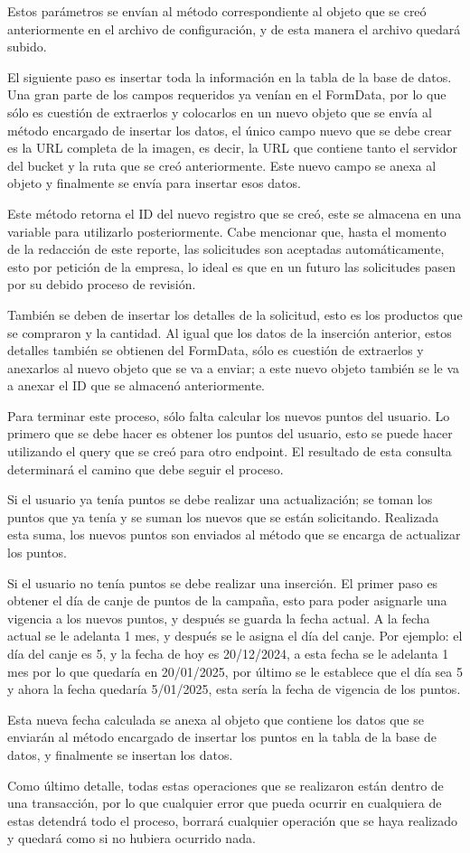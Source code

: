 Estos parámetros se envían al método correspondiente al objeto que se creó anteriormente en el archivo de configuración, y de esta manera el archivo quedará subido.

El siguiente paso es insertar toda la información en la tabla de la base de datos. Una gran parte de los campos requeridos ya venían en el FormData, por lo que sólo es cuestión de extraerlos y colocarlos en un nuevo objeto que se envía al método encargado de insertar los datos, el único campo nuevo que se debe crear es la URL completa de la imagen, es decir, la URL que contiene tanto el servidor del bucket y la ruta que se creó anteriormente. Este nuevo campo se anexa al objeto y finalmente se envía para insertar esos datos.

Este método retorna el ID del nuevo registro que se creó, este se almacena en una variable para utilizarlo posteriormente. Cabe mencionar que, hasta el momento de la redacción de este reporte, las solicitudes son aceptadas automáticamente, esto por petición de la empresa, lo ideal es que en un futuro las solicitudes pasen por su debido proceso de revisión.

También se deben de insertar los detalles de la solicitud, esto es los productos que se compraron y la cantidad. Al igual que los datos de la inserción anterior, estos detalles también se obtienen del FormData, sólo es cuestión de extraerlos y anexarlos al nuevo objeto que se va a enviar; a este nuevo objeto también se le va a anexar el ID que se almacenó anteriormente.

Para terminar este proceso, sólo falta calcular los nuevos puntos del usuario. Lo primero que se debe hacer es obtener los puntos del usuario, esto se puede hacer utilizando el query que se creó para otro endpoint. El resultado de esta consulta determinará el camino que debe seguir el proceso.

Si el usuario ya tenía puntos se debe realizar una actualización; se toman los puntos que ya tenía y se suman los nuevos que se están solicitando. Realizada esta suma, los nuevos puntos son enviados al método que se encarga de actualizar los puntos.

Si el usuario no tenía puntos se debe realizar una inserción. El primer paso es obtener el día de canje de puntos de la campaña, esto para poder asignarle una vigencia a los nuevos puntos, y después se guarda la fecha actual. A la fecha actual se le adelanta 1 mes, y después se le asigna el día del canje. Por ejemplo: el día del canje es 5, y la fecha de hoy es 20/12/2024, a esta fecha se le adelanta 1 mes por lo que quedaría en 20/01/2025, por último se le establece que el día sea 5 y ahora la fecha quedaría 5/01/2025, esta sería la fecha de vigencia de los puntos.

Esta nueva fecha calculada se anexa al objeto que contiene los datos que se enviarán al método encargado de insertar los puntos en la tabla de la base de datos, y finalmente se insertan los datos.

Como último detalle, todas estas operaciones que se realizaron están dentro de una transacción, por lo que cualquier error que pueda ocurrir en cualquiera de estas detendrá todo el proceso, borrará cualquier operación que se haya realizado y quedará como si no hubiera ocurrido nada.